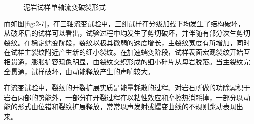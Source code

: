 \begin{figure}[ht!]
{\begin{minipage}{6cm}
        \end{minipage}
    }
    \centering
    \centering
    \caption{泥岩试样单轴流变破裂形式}
    \label{fig:2-6}
\end{figure}

而如图\ref{fig:2-7}，在三轴流变试验中，三组试样在分级加载下均发生了结构破坏，从破坏后的试样可以看出，试验过程中均发生了剪切破坏，并伴随有部分次生剪切裂纹。在稳定蠕变阶段，裂纹以极其微弱的速度增长，主裂纹宽度有所增加，同时在试样主裂纹附近产生新的细小裂纹。在加速蠕变阶段，试样表面宏观裂纹开始互相贯通，膨胀扩容现象明显，由裂纹交织形成的细小碎片从母岩脱落。当主裂纹完全贯通，试样破坏，由动能释放产生的声响较大。

在流变试验中，裂纹的开裂扩展实质是能量耗散的过程。对岩石所做的功除累积于岩石内部的势能外，一部分在开裂过程在以粘性效应和摩擦热消耗掉，一部分以动能的形式由位错和裂纹扩展释放，常常以声发射或蠕变曲线的不规则跳动表现出来。

